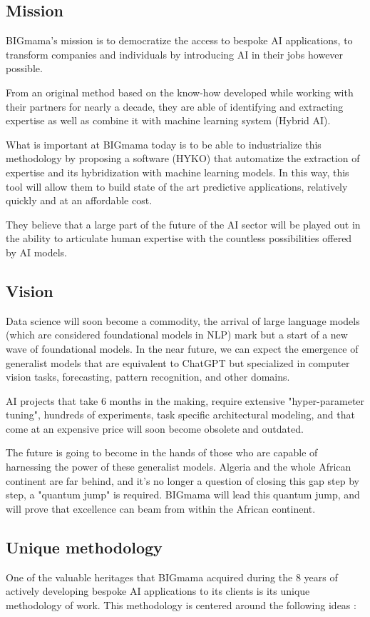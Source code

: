 \documentclass[a4paper,12pt]{article}
\begin{document}
\subsection{Mission}
BIGmama's mission is to democratize the access to bespoke AI applications, to transform companies and individuals by introducing AI in their jobs however possible. 

From an original method based on the know-how developed while working with their partners for nearly a decade, 
they are able of identifying and extracting expertise as well as combine it with machine learning system (Hybrid AI).

What is important at BIGmama today is to be able to industrialize this methodology by proposing a software (HYKO) that automatize the extraction of expertise and 
its hybridization with machine learning models. In this way, this tool will allow them to build state of the art predictive applications, relatively quickly and at an affordable cost.

They believe that a large part of the future of the AI sector will be played out in the ability to articulate human expertise with the countless possibilities offered by AI models.

\subsection{Vision}
Data science will soon become a commodity, the arrival of large language models (which are considered foundational models in NLP) mark but a start of a new wave of foundational models. In the near future, we can expect the emergence of generalist models that are equivalent to ChatGPT but specialized in computer vision tasks, forecasting, pattern recognition, and other domains.

AI projects that take 6 months in the making, require extensive "hyper-parameter tuning", hundreds of experiments, task specific architectural modeling, and that come at an expensive price will soon become obsolete and outdated.

The future is going to become in the hands of those who are capable of harnessing the power of these generalist models. Algeria and the whole African continent are far behind, and it's no longer a question of closing this gap step by step, a "quantum jump" is required. BIGmama will lead this quantum jump, and will prove that excellence can beam from within the African continent. 

\subsection{Unique methodology}
One of the valuable heritages that BIGmama acquired during the 8 years of actively developing bespoke AI applications to its clients is its unique methodology of work. 
This methodology is centered around the following ideas : 
\end{document}
